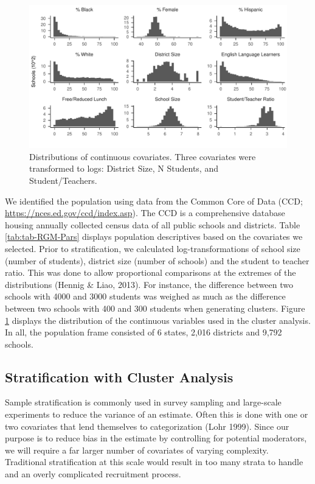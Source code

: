 \documentclass[english,man,floatsintext]{apa6}
\begin{document}
\begin{figure}
\centering
\includegraphics{6---Paper_files/figure-latex/fig-dist1-1.pdf}
\caption{\label{fig:fig-dist1}Distributions of continuous covariates. Three covariates were transformed to logs: District Size, N Students, and Student/Teachers.}
\end{figure}

We identified the population using data from the Common Core of Data (CCD; \url{https://nces.ed.gov/ccd/index.asp}). The CCD is a comprehensive database housing annually collected census data of all public schools and districts. Table \ref{tab:tab-RGM-Pars} displays population descriptives based on the covariates we selected. Prior to stratification, we calculated log-transformations of school size (number of students), district size (number of schools) and the student to teacher ratio. This was done to allow proportional comparisons at the extremes of the distributions (Hennig \& Liao, 2013). For instance, the difference between two schools with 4000 and 3000 students was weighed as much as the difference between two schools with 400 and 300 students when generating clusters. Figure \ref{fig:fig-dist1} displays the distribution of the continuous variables used in the cluster analysis. In all, the population frame consisted of 6 states, 2,016 districts and 9,792 schools.

\hypertarget{stratification-with-cluster-analysis}{%
\subsection{Stratification with Cluster Analysis}\label{stratification-with-cluster-analysis}}

Sample stratification is commonly used in survey sampling and large-scale experiments to reduce the variance of an estimate. Often this is done with one or two covariates that lend themselves to categorization (Lohr 1999). Since our purpose is to reduce bias in the estimate by controlling for potential moderators, we will require a far larger number of covariates of varying complexity. Traditional stratification at this scale would result in too many strata to handle and an overly complicated recruitment process.
\end{document}
